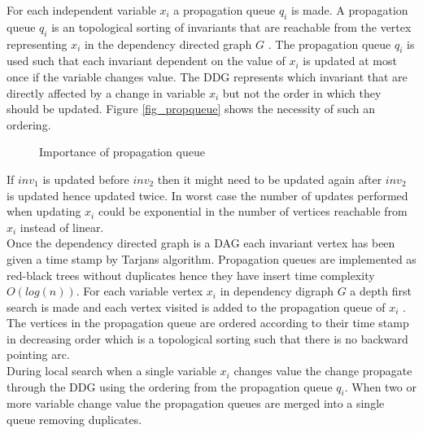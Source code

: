 For each independent variable $x_i$ a propagation queue $q_i$ is made. A propagation queue $q_i$ is an 
topological sorting of invariants that are reachable from the vertex representing $x_i$ in the dependency directed 
graph $G$ . The propagation queue $q_i$ is used such that each invariant dependent on the 
value of $x_i$ is updated at most once if the variable changes value. The DDG represents which invariant that are 
directly affected by a change in variable $x_i$ but not the order in which they should be updated. Figure 
\ref{fig_propqueue} shows the necessity of such an ordering. \\ 
\begin{figure}[b]
\begin{center}
\end{center} \caption{Importance of propagation queue}
\end{figure} \label{fig_propqueue}
If $inv_1$ is updated before $inv_2$ then it might need to be updated again after $inv_2$ is updated hence updated 
twice. In worst case the number of updates performed when updating $x_i$ could be exponential in the number of vertices 
reachable from $x_i$ instead of linear. \\ 
Once the dependency directed graph is a DAG each invariant vertex has been given a time stamp by Tarjans algorithm. 
Propagation queues are implemented as red-black trees without duplicates hence they have insert time complexity 
$O(log(n))$. For each variable vertex $x_i$ in dependency digraph $G$ a depth first search is made and each vertex 
visited is added to the propagation queue of $x_i$ . The vertices in the propagation queue are ordered according to their time stamp in decreasing 
order which is a topological sorting such that there is no backward pointing arc. \medskip \\ 
During local search when a single variable $x_i$ changes value the change propagate through the DDG using 
the ordering from the propagation queue $q_i$. When two or more variable change value the propagation queues are 
merged into a single queue removing duplicates.  